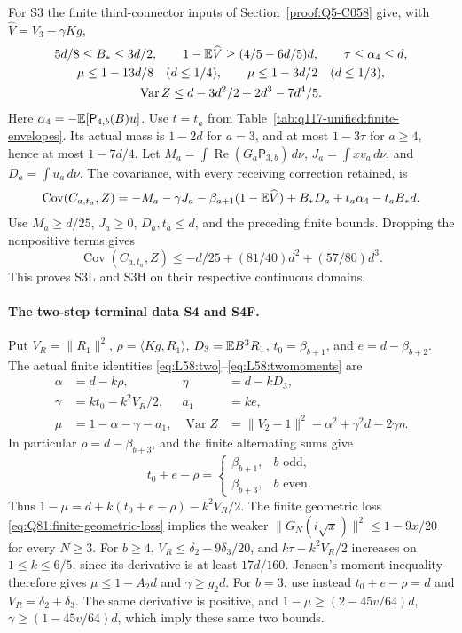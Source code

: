 For S3 the finite third-connector inputs of
Section~\ref{proof:Q5-C058} give, with
\(\widehat V=V_3-\gamma Kg\),
\[
 \begin{gathered}
 5d/8\le B_*\le3d/2,\qquad
 1-\mathbb E\widehat V\ge(4/5-6d/5)d,\qquad
 \tau\le\alpha_4\le d,\\
 \mu\le1-13d/8\quad(d\le1/4),\qquad
 \mu\le1-3d/2\quad(d\le1/3),\\
 \operatorname{Var}Z\le d-3d^2/2+2d^3-7d^4/5.
 \end{gathered}
\]
Here \(\alpha_4=-\mathbb E[\mathsf P_{4,b}(B)u]\).
Use \(t=t_a\) from Table~\ref{tab:q117-unified:finite-envelopes}.
Its actual mass is \(1-2d\) for \(a=3\), and at most
\(1-3\tau\) for \(a\ge4\), hence at most \(1-7d/4\).
Let
\(M_a=\int\operatorname{Re}(G_a\mathsf P_{3,b})\,d\nu\),
\(J_a=\int xv_a\,d\nu\), and \(D_a=\int u_a\,d\nu\).
The covariance, with every receiving correction retained, is
\begin{equation}\label{eq:q117-unified:third-shortone-covariance}
 \operatorname{Cov}(C_{a,t_a},Z)
 =-M_a-\gamma J_a
  -\beta_{a+1}(1-\mathbb E\widehat V)
  +B_*D_a+t_a\alpha_4-t_aB_*d.
\end{equation}
Use \(M_a\ge d/25\), \(J_a\ge0\), \(D_a,t_a\le d\),
and the preceding finite bounds. Dropping the nonpositive terms gives
\[
 \operatorname{Cov}(C_{a,t_a},Z)
 \le-d/25+(81/40)d^2+(57/80)d^3.
\]
This proves S3L and S3H on their respective continuous domains.

\paragraph{The two-step terminal data S4 and S4F.}
Put \(V_R=\|R_1\|^2\), \(\rho=\langle Kg,R_1\rangle\),
\(D_3=\mathbb E B^3R_1\), \(t_0=\beta_{b+1}\),
and \(e=d-\beta_{b+2}\). The actual finite identities
\eqref{eq:L58:two}--\eqref{eq:L58:twomoments} are
\begin{equation}\label{eq:q117-unified:two-step-identities}
\begin{aligned}
 \alpha&=d-k\rho,& \eta&=d-kD_3,\\
 \gamma&=kt_0-k^2V_R/2,& a_1&=ke,\\
 \mu&=1-\alpha-\gamma-a_1,&
 \operatorname{Var}Z
  &=\|V_2-1\|^2-\alpha^2+\gamma^2d-2\gamma\eta.
\end{aligned}
\end{equation}
In particular \(\rho=d-\beta_{b+3}\), and the finite alternating
sums give
\[
 t_0+e-\rho=
 \begin{cases}\beta_{b+1},&b\text{ odd},\\
                \beta_{b+3},&b\text{ even}.
 \end{cases}
\]
Thus \(1-\mu=d+k(t_0+e-\rho)-k^2V_R/2\).
The finite geometric loss \eqref{eq:Q81:finite-geometric-loss}
implies the weaker \(\|G_N(i\sqrt x)\|^2\le1-9x/20\)
for every \(N\ge3\). For \(b\ge4\),
\(V_R\le\delta_2-9\delta_3/20\), and
\(k\tau-k^2V_R/2\) increases on \(1\le k\le6/5\),
since its derivative is at least \(17d/160\).
Jensen's moment inequality therefore gives
\(\mu\le1-A_2d\) and \(\gamma\ge g_2d\).
For \(b=3\), use instead \(t_0+e-\rho=d\) and
\(V_R=\delta_2+\delta_3\). The same derivative is positive,
and \(1-\mu\ge(2-45v/64)d\),
\(\gamma\ge(1-45v/64)d\), which imply these same two bounds.

